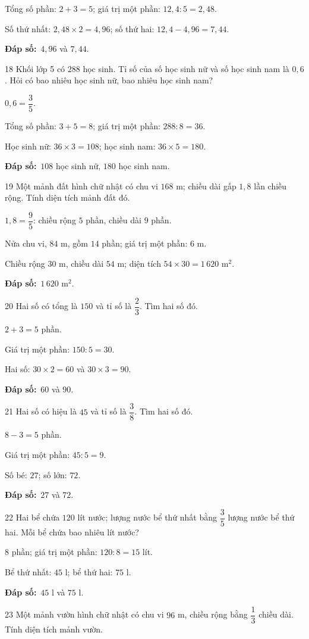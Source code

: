 \documentclass[11pt]{article}
\newif\ifsol \solfalse
\providecommand{\AnsWord}{Đáp số}
\newcommand{\dapso}[1]{\par\textbf{\AnsWord:}\ #1}
\newcommand{\probsol}[1]{%
  \begin{lrbox}{\solmeasure}\begin{minipage}{\dimexpr\linewidth-24pt\relax}#1\end{minipage}\end{lrbox}%
  \ifsol
    \begin{solbox}#1\end{solbox}%
  \else
    \setlength{\solht}{\dimexpr\ht\solmeasure+\dp\solmeasure+0.85cm\relax}%
    \ifdim\solht<1.35cm\setlength{\solht}{1.35cm}\fi
    \begin{tcolorbox}[colback=white,colframe=Line,boxrule=0.8pt,arc=5pt,
      left=8pt,right=8pt,top=4pt,bottom=4pt,height=\solht]{\footnotesize\color{Slate}\itshape\WorkWord}\end{tcolorbox}%
  \fi}
\newcommand{\gap}{\vspace{0.3cm}}
\def\WorkWord{Bài làm:}
\def\AnsWord{Đáp số}
\begin{document}
\probsol{
Tổng số phần: $2+3=5$; giá trị một phần: $12{,}4:5=2{,}48$.\par Số thứ nhất: $2{,}48\times2=4{,}96$; số thứ hai: $12{,}4-4{,}96=7{,}44$.
\dapso{$4{,}96$ và $7{,}44$.}}
\gap
\begin{probbox}{18}{\relax}
Khối lớp 5 có $288$ học sinh. Tỉ số của số học sinh nữ và số học sinh nam là $0{,}6$. Hỏi có bao nhiêu học sinh nữ, bao nhiêu học sinh nam?
\end{probbox}
\probsol{
$0{,}6=\dfrac35$.\par Tổng số phần: $3+5=8$; giá trị một phần: $288:8=36$.\par Học sinh nữ: $36\times3=108$; học sinh nam: $36\times5=180$.
\dapso{$108$ học sinh nữ, $180$ học sinh nam.}}
\gap
\begin{probbox}{19}{\relax}
Một mảnh đất hình chữ nhật có chu vi $168$ m; chiều dài gấp $1{,}8$ lần chiều rộng. Tính diện tích mảnh đất đó.
\end{probbox}
\probsol{
$1{,}8=\dfrac95$: chiều rộng $5$ phần, chiều dài $9$ phần.\par Nửa chu vi, $84$ m, gồm $14$ phần; giá trị một phần: $6$ m.\par
Chiều rộng $30$ m, chiều dài $54$ m; diện tích $54\times30=1\,620$ m$^2$.
\dapso{$1\,620$ m$^2$.}}
\gap
\begin{probbox}{20}{\relax}
Hai số có tổng là $150$ và tỉ số là $\dfrac23$. Tìm hai số đó.
\end{probbox}
\probsol{
$2+3=5$ phần.\par Giá trị một phần: $150:5=30$.\par Hai số: $30\times2=60$ và $30\times3=90$.
\dapso{$60$ và $90$.}}
\gap
\begin{probbox}{21}{\relax}
Hai số có hiệu là $45$ và tỉ số là $\dfrac38$. Tìm hai số đó.
\end{probbox}
\probsol{
$8-3=5$ phần.\par Giá trị một phần: $45:5=9$.\par Số bé: $27$; số lớn: $72$.
\dapso{$27$ và $72$.}}
\gap
\begin{probbox}{22}{\relax}
Hai bể chứa $120$ lít nước; lượng nước bể thứ nhất bằng $\dfrac35$ lượng nước bể thứ hai. Mỗi bể chứa bao nhiêu lít nước?
\end{probbox}
\probsol{
$8$ phần; giá trị một phần: $120:8=15$ lít.\par Bể thứ nhất: $45$ l; bể thứ hai: $75$ l.
\dapso{$45$ l và $75$ l.}}
\gap
\begin{probbox}{23}{\relax}
Một mảnh vườn hình chữ nhật có chu vi $96$ m, chiều rộng bằng $\dfrac13$ chiều dài. Tính diện tích mảnh vườn.
\end{probbox}
\end{document}
